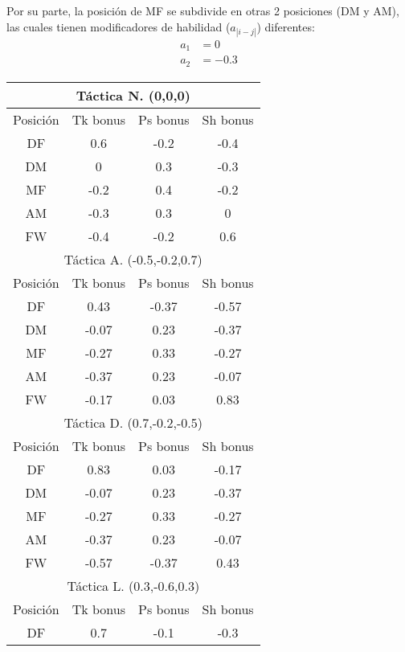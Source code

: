 \documentclass[a4paper,9pt]{article}
\begin{document}
Por su parte, la posición de MF se subdivide en otras 2 posiciones (DM y AM), las cuales tienen modificadores de habilidad ($a_{|i-j|}$) diferentes:
\begin{align}
	a_1 &= 0\\
	a_2 &= -0.3
\end{align}

\begin{table}
  \begin{center}
    \begin{tabular}{c c c c}
    	\multicolumn{4}{c}{Táctica N. (0,0,0)}\\
      \hline
      Posición & Tk bonus & Ps bonus & Sh bonus\\
      \hline
      DF & 0.6 & -0.2 & -0.4 \\
      DM & 0 & 0.3 & -0.3 \\
      MF & -0.2 & 0.4 & -0.2 \\
      AM & -0.3 & 0.3 & 0 \\
      FW & -0.4 & -0.2 & 0.6 \\
      \hline\hline
      \multicolumn{4}{c}{Táctica A. (-0.5,-0.2,0.7)}\\
      \hline
      Posición & Tk bonus & Ps bonus & Sh bonus\\
      \hline
      DF & 0.43 & -0.37 & -0.57 \\
      DM & -0.07 & 0.23 & -0.37 \\
      MF & -0.27 & 0.33 & -0.27 \\
      AM & -0.37 & 0.23 & -0.07 \\
      FW & -0.17 & 0.03 & 0.83 \\
      \hline\hline
      \multicolumn{4}{c}{Táctica D. (0.7,-0.2,-0.5)}\\
      \hline
      Posición & Tk bonus & Ps bonus & Sh bonus\\
      \hline
      DF & 0.83 & 0.03 & -0.17 \\
      DM & -0.07 & 0.23 & -0.37 \\
      MF & -0.27 & 0.33 & -0.27 \\
      AM & -0.37 & 0.23 & -0.07 \\
      FW & -0.57 & -0.37 & 0.43 \\
      \hline\hline
      \multicolumn{4}{c}{Táctica L. (0.3,-0.6,0.3)}\\
      \hline
      Posición & Tk bonus & Ps bonus & Sh bonus\\
      \hline
      DF & 0.7 & -0.1 & -0.3 \\

\end{tabular}
\end{center}
\end{table}
\end{document}
